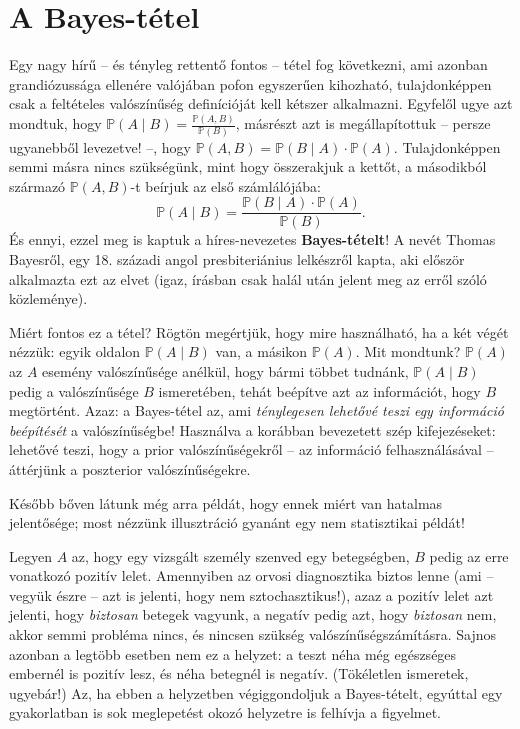 \documentclass[magyar,]{book}
\begin{document}
\hypertarget{bayesvalszam}{%
\section{A Bayes-tétel}\label{bayesvalszam}}

Egy nagy hírű -- és tényleg rettentő fontos -- tétel fog következni, ami azonban grandiózussága ellenére valójában pofon egyszerűen kihozható, tulajdonképpen csak a feltételes valószínűség definícióját kell kétszer alkalmazni. Egyfelől ugye azt mondtuk, hogy \(\mathbb{P}\left(A \mid B\right) = \frac{\mathbb{P}\left(A,B\right)}{\mathbb{P}\left(B\right)}\), másrészt azt is megállapítottuk -- persze ugyanebből levezetve! --, hogy \(\mathbb{P}\left(A,B\right)=\mathbb{P}\left(B \mid A\right)\cdot \mathbb{P}\left(A\right)\). Tulajdonképpen semmi másra nincs szükségünk, mint hogy összerakjuk a kettőt, a másodikból származó \(\mathbb{P}\left(A,B\right)\)-t beírjuk az első számlálójába:
\[
\mathbb{P}\left(A \mid B\right) = \frac{\mathbb{P}\left(B \mid A\right)\cdot \mathbb{P}\left(A\right)}{\mathbb{P}\left(B\right)}.
\]
És ennyi, ezzel meg is kaptuk a híres-nevezetes \textbf{Bayes-tételt}! A nevét Thomas Bayesről, egy 18. századi angol presbiteriánius lelkészről kapta, aki először alkalmazta ezt az elvet (igaz, írásban csak halál után jelent meg az erről szóló közleménye).

Miért fontos ez a tétel? Rögtön megértjük, hogy mire használható, ha a két végét nézzük: egyik oldalon \(\mathbb{P}\left(A \mid B\right)\) van, a másikon \(\mathbb{P}\left(A\right)\). Mit mondtunk? \(\mathbb{P}\left(A\right)\) az \(A\) esemény valószínűsége anélkül, hogy bármi többet tudnánk, \(\mathbb{P}\left(A \mid B\right)\) pedig a valószínűsége \(B\) ismeretében, tehát beépítve azt az információt, hogy \(B\) megtörtént. Azaz: a Bayes-tétel az, ami \emph{ténylegesen lehetővé teszi egy információ beépítését} a valószínűségbe! Használva a korábban bevezetett szép kifejezéseket: lehetővé teszi, hogy a prior valószínűségekről -- az információ felhasználásával -- áttérjünk a poszterior valószínűségekre.

Később bőven látunk még arra példát, hogy ennek miért van hatalmas jelentősége; most nézzünk illusztráció gyanánt egy nem statisztikai példát!

Legyen \(A\) az, hogy egy vizsgált személy szenved egy betegségben, \(B\) pedig az erre vonatkozó pozitív lelet. Amennyiben az orvosi diagnosztika biztos lenne (ami -- vegyük észre -- azt is jelenti, hogy nem sztochasztikus!), azaz a pozitív lelet azt jelenti, hogy \emph{biztosan} betegek vagyunk, a negatív pedig azt, hogy \emph{biztosan} nem, akkor semmi probléma nincs, és nincsen szükség valószínűségszámításra. Sajnos azonban a legtöbb esetben nem ez a helyzet: a teszt néha még egészséges embernél is pozitív lesz, és néha betegnél is negatív. (Tökéletlen ismeretek, ugyebár!) Az, ha ebben a helyzetben végiggondoljuk a Bayes-tételt, egyúttal egy gyakorlatban is sok meglepetést okozó helyzetre is felhívja a figyelmet.
\end{document}
